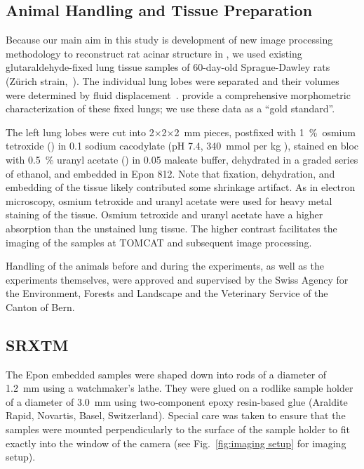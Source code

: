 \subsection[Animal Handling]{Animal Handling and Tissue Preparation}
Because our main aim in this study is development of new image processing methodology to reconstruct rat acinar structure in \threed, we used existing glutaraldehyde-fixed lung tissue samples of 60-day-old Sprague-Dawley rats (Zürich strain,~\cite{Tschanz2003}). The individual lung lobes were separated and their volumes were determined by fluid displacement~\cite{Scherle1970}. \citet{Tschanz2003} provide a comprehensive morphometric characterization of these fixed lungs; we use these data as a ``gold standard''.

The left lung lobes were cut into 2$\times$2$\times$\SI{2}{\milli\meter} pieces, postfixed with \SI{1}{\percent}~osmium tetroxide () in \SI{0.1}{\Molar} sodium cacodylate (pH 7.4, \SI{340}{\mmol} per \si{\kilogram} ), stained en bloc with \SI{0.5}{\percent} uranyl acetate () in \SI{0.05}{\Molar} maleate buffer, dehydrated in a graded series of ethanol, and embedded in Epon 812. Note that fixation, dehydration, and embedding of the tissue likely contributed some shrinkage artifact. As in electron microscopy, osmium tetroxide and uranyl acetate were used for heavy metal staining of the tissue. Osmium tetroxide and uranyl acetate have a higher absorption than the unstained lung tissue. The higher contrast facilitates the imaging of the samples at \ac{TOMCAT} and subsequent image processing.

Handling of the animals before and during the experiments, as well as the experiments themselves, were approved and supervised by the Swiss Agency for the Environment, Forests and Landscape and the Veterinary Service of the Canton of Bern.

\subsection{SRXTM}
The Epon embedded samples were shaped down into rods of a diameter of \SI{1.2}{\milli\meter} using a watchmaker's lathe. They were glued on a rodlike sample holder of a diameter of \SI{3.0}{\milli\meter} using two-component epoxy resin-based glue (Araldite Rapid, Novartis, Basel, Switzerland). Special care was taken to ensure that the samples were mounted perpendicularly to the surface of the sample holder to fit exactly into the window of the camera (see Fig.~\ref{fig:imaging setup} for imaging setup).

